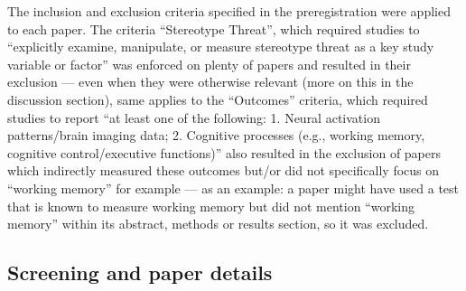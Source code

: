 \documentclass[
  stu, a4paper, 12pt,mask,floatsintext]{apa7}
\begin{document}
The inclusion and exclusion criteria specified in the preregistration were applied to each paper.
The criteria ``Stereotype Threat'', which required studies to ``explicitly examine, manipulate, or measure stereotype threat as a key study variable or factor'' was enforced on plenty of papers and resulted in their exclusion --- even when they were otherwise relevant (more on this in the discussion section), same applies to the ``Outcomes'' criteria, which required studies to report ``at least one of the following: 1. Neural activation patterns/brain imaging data; 2. Cognitive processes (e.g., working memory, cognitive control/executive functions)'' also resulted in the exclusion of papers which indirectly measured these outcomes but/or did not specifically focus on ``working memory'' for example --- as an example: a paper might have used a test that is known to measure working memory but did not mention ``working memory'' within its abstract, methods or results section, so it was excluded.

\subsection{Screening and paper details}\label{screening-and-paper-details}
\end{document}
